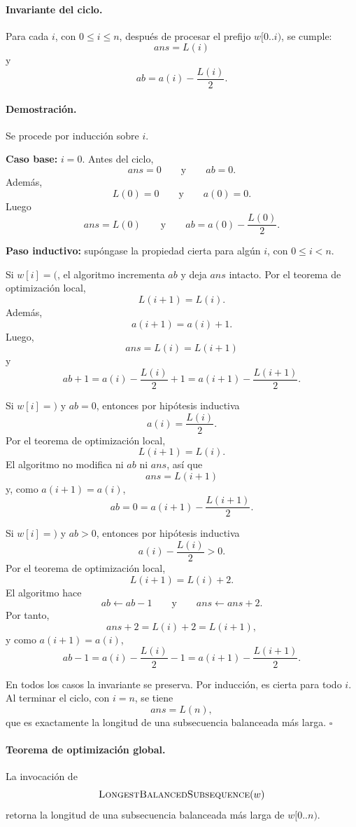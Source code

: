 \documentclass[11pt]{article}
\begin{document}
\paragraph{Invariante del ciclo.}
Para cada \(i\), con \(0\leq i\leq n\), después de procesar el prefijo \(w[0..i)\), se cumple:
\[
ans=L(i)
\]
y
\[
ab=a(i)-\frac{L(i)}{2}.
\]

\paragraph{Demostración.}
Se procede por inducción sobre \(i\).

\textbf{Caso base:} \(i=0\). Antes del ciclo,
\[
ans=0
\qquad\text{y}\qquad
ab=0.
\]
Además,
\[
L(0)=0
\qquad\text{y}\qquad
a(0)=0.
\]
Luego
\[
ans=L(0)
\qquad\text{y}\qquad
ab=a(0)-\frac{L(0)}{2}.
\]

\textbf{Paso inductivo:} supóngase la propiedad cierta para algún \(i\), con \(0\leq i<n\).

Si \(w[i]=\texttt{(}\), el algoritmo incrementa \(ab\) y deja \(ans\) intacto. Por el
teorema de optimización local,
\[
L(i+1)=L(i).
\]
Además,
\[
a(i+1)=a(i)+1.
\]
Luego,
\[
ans=L(i)=L(i+1)
\]
y
\[
ab+1
=
a(i)-\frac{L(i)}{2}+1
=
a(i+1)-\frac{L(i+1)}{2}.
\]

Si \(w[i]=\texttt{)}\) y \(ab=0\), entonces por hipótesis inductiva
\[
a(i)=\frac{L(i)}{2}.
\]
Por el teorema de optimización local,
\[
L(i+1)=L(i).
\]
El algoritmo no modifica ni \(ab\) ni \(ans\), así que
\[
ans=L(i+1)
\]
y, como \(a(i+1)=a(i)\),
\[
ab=0=a(i+1)-\frac{L(i+1)}{2}.
\]

Si \(w[i]=\texttt{)}\) y \(ab>0\), entonces por hipótesis inductiva
\[
a(i)-\frac{L(i)}{2}>0.
\]
Por el teorema de optimización local,
\[
L(i+1)=L(i)+2.
\]
El algoritmo hace
\[
ab \gets ab-1
\qquad\text{y}\qquad
ans \gets ans+2.
\]
Por tanto,
\[
ans+2=L(i)+2=L(i+1),
\]
y como \(a(i+1)=a(i)\),
\[
ab-1
=
a(i)-\frac{L(i)}{2}-1
=
a(i+1)-\frac{L(i+1)}{2}.
\]

En todos los casos la invariante se preserva. Por inducción, es cierta para todo \(i\).
Al terminar el ciclo, con \(i=n\), se tiene
\[
ans=L(n),
\]
que es exactamente la longitud de una subsecuencia balanceada más larga. \(\square\)

\paragraph{Teorema de optimización global.}
La invocación de
\[
\textsc{LongestBalancedSubsequence}(w)
\]
retorna la longitud de una subsecuencia balanceada más larga de \(w[0..n)\).
\end{document}
